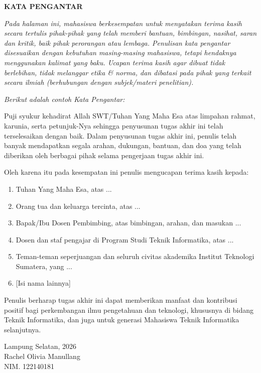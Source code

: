 \clearpage
{}%

\begin{justifying}
	\large \bfseries \centering \MakeUppercase{Kata Pengantar}\linebreak
	
	\normalsize \normalfont \justifying
	\textit{Pada halaman ini, mahasiswa berkesempatan untuk menyatakan terima kasih secara tertulis pihak-pihak yang telah memberi bantuan, bimbingan, nasihat, saran dan kritik, baik pihak perorangan atau lembaga. Penulisan kata pengantar disesuaikan dengan kebutuhan masing-masing mahasiswa, tetapi hendaknya menggunakan kalimat yang baku. Ucapan terima kasih agar dibuat tidak berlebihan, tidak melanggar etika \& norma, dan dibatasi pada pihak yang terkait secara ilmiah (berhubungan dengan subjek/materi penelitian). } \par
	\textit{Berikut adalah contoh Kata Pengantar:} \par
	Puji syukur kehadirat Allah SWT/Tuhan Yang Maha Esa atas limpahan rahmat, karunia, serta petunjuk-Nya sehingga penyusunan tugas akhir ini telah terselesaikan dengan baik. Dalam penyusunan tugas akhir ini, penulis telah banyak mendapatkan segala arahan, dukungan, bantuan, dan doa yang telah diberikan oleh berbagai pihak selama pengerjaan tugas akhir ini. \par
	Oleh karena itu pada kesempatan ini penulis mengucapan terima kasih kepada: \par
	\begin{enumerate}
		\item Tuhan Yang Maha Esa, atas ...
		\item Orang tua dan keluarga tercinta, atas ...		
		\item Bapak/Ibu Dosen Pembimbing, atas bimbingan, arahan, dan masukan ...
		\item Dosen dan staf pengajar di Program Studi Teknik Informatika, atas ...
		\item Teman-teman seperjuangan dan seluruh civitas akademika Institut Teknologi Sumatera, yang ...
		\item {[Isi nama lainnya]}
	\end{enumerate} \par
	Penulis berharap tugas akhir ini dapat memberikan manfaat dan kontribusi positif bagi perkembangan ilmu pengetahuan dan teknologi, khususnya di bidang Teknik Informatika, dan juga untuk generasi Mahasiswa Teknik Informatika selanjutnya.
	\vspace{12pt}
	\begin{flushright}
	Lampung Selatan, 2026\\
	\vspace{20pt}
	Rachel Olivia Manullang\\
	NIM. 122140181
	\end{flushright}
	\vfill
	
\end{justifying}
\clearpage